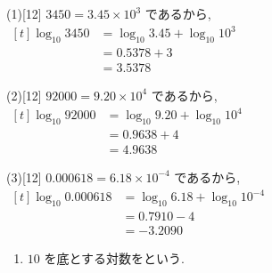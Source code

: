 \documentclass[14pt,dvipdfmx]{jsarticle}
\begin{document}
\begin{answerbox}{(1)}[12]
  $3450 = 3.45 \times 10^{3}$ であるから,\\
  $\begin{aligned}[t]
    \log_{10} 3450 &= \log_{10} 3.45 + \log_{10} 10^{3} \\
    &= 0.5378 + 3 \\
    &= 3.5378
  \end{aligned}$
\end{answerbox}
\vspace{0.08em}
\begin{answerbox}{(2)}[12]
  $92000 = 9.20 \times 10^{4}$ であるから,\\
  $\begin{aligned}[t]
    \log_{10} 92000 &= \log_{10} 9.20 + \log_{10} 10^{4} \\
    &= 0.9638 + 4 \\
    &= 4.9638
  \end{aligned}$
\end{answerbox}
\vspace{0.08em}
\begin{answerbox}{(3)}[12]
  $0.000618 = 6.18 \times 10^{-4}$ であるから,\\
  $\begin{aligned}[t]
    \log_{10} 0.000618 &= \log_{10} 6.18 + \log_{10} 10^{-4} \\
    &= 0.7910 - 4 \\
    &= -3.2090
  \end{aligned}$
\end{answerbox}

\vspace{0.35em}
\begin{summarybox}
  \begin{enumerate}[label=\textbf{\arabic*}, leftmargin=1.5zw, itemsep=0.08em]
    \item $10$ を底とする対数をという.
  \end{enumerate}
\end{summarybox}

\vfill
{}
\end{document}
